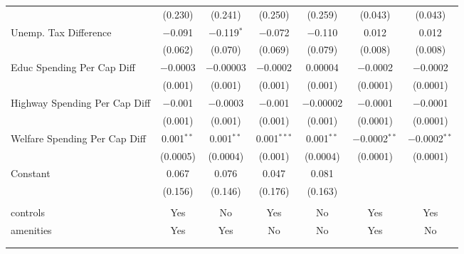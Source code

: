 \begin{table}[!htbp]
\begin{tabular}{@{\extracolsep{5pt}}lcccccc}
  & (0.230) & (0.241) & (0.250) & (0.259) & (0.043) & (0.043) \\ 
  Unemp. Tax Difference & $-$0.091 & $-$0.119$^{*}$ & $-$0.072 & $-$0.110 & 0.012 & 0.012 \\ 
  & (0.062) & (0.070) & (0.069) & (0.079) & (0.008) & (0.008) \\ 
  Educ Spending Per Cap Diff & $-$0.0003 & $-$0.00003 & $-$0.0002 & 0.00004 & $-$0.0002 & $-$0.0002 \\ 
  & (0.001) & (0.001) & (0.001) & (0.001) & (0.0001) & (0.0001) \\ 
  Highway Spending Per Cap Diff & $-$0.001 & $-$0.0003 & $-$0.001 & $-$0.00002 & $-$0.0001 & $-$0.0001 \\ 
  & (0.001) & (0.001) & (0.001) & (0.001) & (0.0001) & (0.0001) \\ 
  Welfare Spending Per Cap Diff & 0.001$^{**}$ & 0.001$^{**}$ & 0.001$^{***}$ & 0.001$^{**}$ & $-$0.0002$^{**}$ & $-$0.0002$^{**}$ \\ 
  & (0.0005) & (0.0004) & (0.001) & (0.0004) & (0.0001) & (0.0001) \\ 
  Constant & 0.067 & 0.076 & 0.047 & 0.081 &  &  \\ 
  & (0.156) & (0.146) & (0.176) & (0.163) &  &  \\ 
 \hline \\[-1.8ex] 
controls & Yes & No & Yes & No & Yes & Yes \\ 
amenities & Yes & Yes & No & No & Yes & No \\ 
\hline \\[-1.8ex] 
\hline 
\hline \\[-1.8ex] 
\end{tabular} 
\end{table} 
